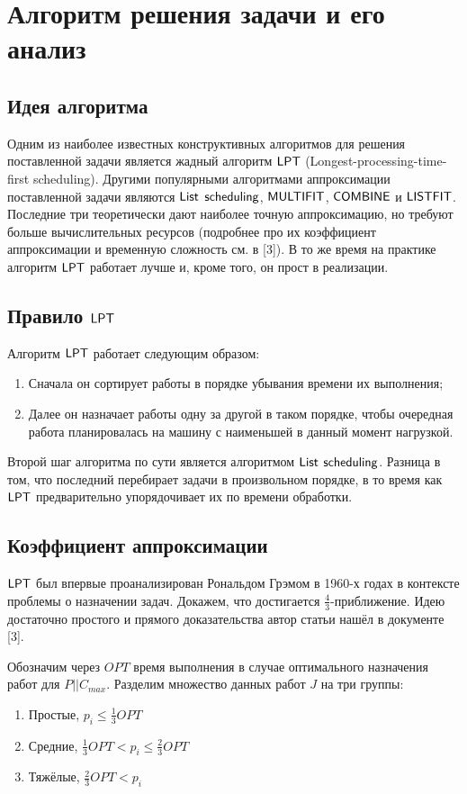 \newpage
\section{Алгоритм решения задачи и его анализ}

\subsection{Идея алгоритма}
Одним из наиболее известных конструктивных алгоритмов для решения поставленной задачи является жадный алгоритм $\sf{LPT}$ (Longest-processing-time-first scheduling). Другими популярными алгоритмами аппроксимации поставленной задачи являются $\sf{List}$ $\sf{scheduling}$, $\sf{MULTIFIT}$, $\sf{COMBINE}$ и $\sf{LISTFIT}$. Последние три теоретически дают наиболее точную аппроксимацию, но требуют больше вычислительных ресурсов (подробнее про их коэффициент аппроксимации и временную сложность см. в [3]). В то же время на практике алгоритм $\sf{LPT}$ работает лучше и, кроме того, он прост в реализации.

\subsection{Правило $\sf{LPT}$}
Алгоритм $\sf{LPT}$ работает следующим образом:
\begin{enumerate}
    \item Сначала он сортирует работы в порядке убывания времени их выполнения;
    \item Далее он назначает работы одну за другой в таком порядке, чтобы очередная работа планировалась на машину с наименьшей в данный момент нагрузкой. 
\end{enumerate}
Второй шаг алгоритма по сути является алгоритмом $\sf{List}$ $\sf{scheduling}$. Разница в том, что последний перебирает задачи в произвольном порядке, в то время как $\sf{LPT}$ предварительно упорядочивает их по времени обработки.

\subsection{Коэффициент аппроксимации}
$\sf{LPT}$ был впервые проанализирован Рональдом Грэмом в 1960-х годах в контексте проблемы о назначении задач. Докажем, что достигается $\frac{4}{3}$-приближение. Идею достаточно простого и прямого доказательства автор статьи нашёл в документе [3].  

Обозначим через $OPT$ время выполнения в случае оптимального назначения работ для $P||C_{max}$. Разделим множество данных работ $J$ на три группы: 
\begin{enumerate}
    \item Простые, $p_{i} \leq \frac{1}{3}OPT$
    \item Средние, $\frac{1}{3}OPT < p_{i} \leq \frac{2}{3}OPT$
    \item Тяжёлые, $\frac{2}{3}OPT < p_{i}$
\end{enumerate}

